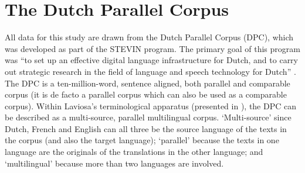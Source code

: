 \section{The Dutch Parallel Corpus}
\label{sec:3.3}
All data for this study are drawn from the Dutch Parallel Corpus (DPC), which was developed as part of the STEVIN program. The primary goal of this program was “to set up an effective digital language infrastructure for Dutch, and to carry out strategic research in the field of language and speech technology for Dutch” \citep[1]{Spyns2013}. The DPC is a ten-million-word, sentence aligned, both parallel and comparable corpus (it is de facto a parallel corpus which can also be used as a comparable corpus). Within Laviosa’s terminological apparatus (presented in ), the DPC can be described as a multi-source, parallel multilingual corpus. ‘Multi-source’ since Dutch, French and English can all three be the source language of the texts in the corpus (and also the target language); ‘parallel’ because the texts in one language are the originals of the translations in the other language; and ‘multilingual’ because more than two languages are involved.

